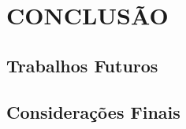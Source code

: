 
\chapter{CONCLUSÃO}
\label{chap:conclusao}

\section{Trabalhos Futuros}
\label{sec:trabalhos_futuros}

\section{Considerações Finais}
\label{sec:consideracoes_finais}